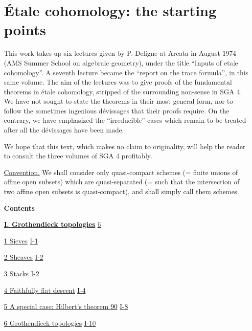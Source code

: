 
\chapter{Étale cohomology: the starting points}\label{I}

This work takes up six lectures given by P. Deligne at Arcata in August 1974
(AMS Summer School on algebraic geometry), under the title ``Inputs of etale
cohomology''. A seventh lecture became the ``report on the trace formula'',
in this same volume. The aim of the lectures was to give proofs of the
fundamental theorems in étale cohomology, stripped of the surrounding
non-sense in SGA 4. We have not sought to state the theorems in their most
general form, nor to follow the sometimes ingenious dévissages that their
proofs require. On the contrary, we have emphasized the ``irreducible''
cases which remain to be treated after all the dévissages have been made.

We hope that this text, which makes no claim to originality, will help the
reader to consult the three volumes of SGA 4 profitably.

\medskip
\noindent\underline{Convention.} We shall consider only quasi-compact
schemes (= finite unions of affine open subsets) which are quasi-separated
(= such that the intersection of two affine open subsets is quasi-compact),
and shall simply call them schemes.

\newpage

\begingroup
\small
\setlength{\parindent}{0pt}
\begin{center}
  \textbf{Contents}
\end{center}

\hyperref[I:1]{\textbf{I. Grothendieck topologies}}\dotfill
  \hyperref[I:1]{6}\par
\hspace*{1.5em}\hyperref[I:1-1]{1 Sieves}\dotfill
  \hyperref[I:1-1]{I-1}\par
\hspace*{1.5em}\hyperref[I:1-2]{2 Sheaves}\dotfill
  \hyperref[I:1-2]{I-2}\par
\hspace*{1.5em}\hyperref[I:1-3]{3 Stacks}\dotfill
  \hyperref[I:1-3]{I-2}\par
\hspace*{1.5em}\hyperref[I:1-4]{4 Faithfully flat descent}\dotfill
  \hyperref[I:1-4]{I-4}\par
\hspace*{1.5em}\hyperref[I:1-5]{5 A special case: Hilbert’s theorem 90}\dotfill
  \hyperref[I:1-5]{I-8}\par
\hspace*{1.5em}\hyperref[I:1-6]{6 Grothendieck topologies}\dotfill
  \hyperref[I:1-6]{I-10}\par

